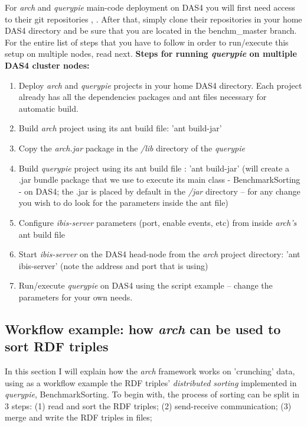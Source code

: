 For \textit{arch} and \textit{querypie} main-code deployment on DAS4 you will first need access to their git repositories \cite{arch_repo}, \cite{qpie_repo}. After that, simply clone their repositories in your home DAS4 directory and be sure that you are located in the benchm\_master branch. For the entire list of steps that you have to follow in order to run/execute this setup on multiple nodes, read next.
\newline
\newline
\textbf{Steps for running \textit{querypie} on multiple DAS4 cluster nodes:}
\begin{enumerate}
	\item Deploy \textit{arch} and \textit{querypie} projects in your home DAS4 directory. Each project already has all the dependencies packages and ant files necessary for automatic build. 
	\item Build \textit{arch} project using its ant build file: 'ant build-jar' 
	\item Copy the \textit{arch.jar} package in the \textit{/lib} directory of the \textit{querypie}
	\item Build \textit{querypie} project using its ant build file \cite{build_file}: 'ant build-jar' (will create a .jar bundle package that we use to execute its main class - BenchmarkSorting - on DAS4; the .jar is placed by default in the \textit{/jar} directory -- for any change you wish to do look for the parameters inside the ant file)
	\item Configure \textit{ibis-server} parameters (port, enable events, etc) from inside \textit{arch's} ant build file 
	\item Start \textit{ibis-server} on the DAS4 head-node from the \textit{arch} project directory: 'ant ibis-server' (note the address and port that is using)
	\item Run/execute \textit{querypie} on DAS4 using the script example \cite{run_on_das4} -- change the parameters for your own needs.
\end{enumerate}

% 
\subsection{Workflow example: how \textit{arch} can be used to sort RDF triples}

In this section I will explain how the \textit{arch} framework works on 'crunching' data, using as a workflow example the RDF triples' \textit{distributed sorting} implemented in \textit{querypie}, BenchmarkSorting. To begin with, the process of sorting can be split in 3 steps: (1) read and sort the RDF triples; (2) send-receive communication; (3) merge and write the RDF triples in files;

